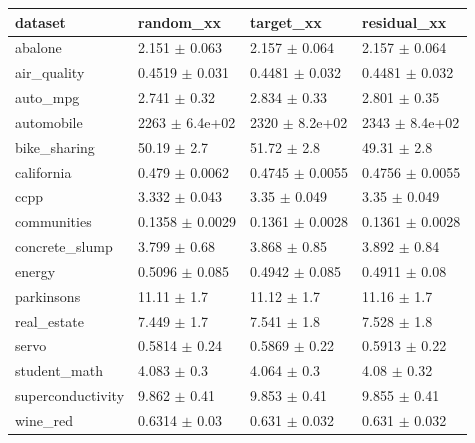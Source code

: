 \begin{tabular}{llll}
\toprule
dataset & random\_xx & target\_xx & residual\_xx \\
\midrule
abalone & 2.151 $\pm$ 0.063 & 2.157 $\pm$ 0.064 & 2.157 $\pm$ 0.064 \\
air\_quality & 0.4519 $\pm$ 0.031 & 0.4481 $\pm$ 0.032 & 0.4481 $\pm$ 0.032 \\
auto\_mpg & 2.741 $\pm$ 0.32 & 2.834 $\pm$ 0.33 & 2.801 $\pm$ 0.35 \\
automobile & 2263 $\pm$ 6.4e+02 & 2320 $\pm$ 8.2e+02 & 2343 $\pm$ 8.4e+02 \\
bike\_sharing & 50.19 $\pm$ 2.7 & 51.72 $\pm$ 2.8 & 49.31 $\pm$ 2.8 \\
california & 0.479 $\pm$ 0.0062 & 0.4745 $\pm$ 0.0055 & 0.4756 $\pm$ 0.0055 \\
ccpp & 3.332 $\pm$ 0.043 & 3.35 $\pm$ 0.049 & 3.35 $\pm$ 0.049 \\
communities & 0.1358 $\pm$ 0.0029 & 0.1361 $\pm$ 0.0028 & 0.1361 $\pm$ 0.0028 \\
concrete\_slump & 3.799 $\pm$ 0.68 & 3.868 $\pm$ 0.85 & 3.892 $\pm$ 0.84 \\
energy & 0.5096 $\pm$ 0.085 & 0.4942 $\pm$ 0.085 & 0.4911 $\pm$ 0.08 \\
parkinsons & 11.11 $\pm$ 1.7 & 11.12 $\pm$ 1.7 & 11.16 $\pm$ 1.7 \\
real\_estate & 7.449 $\pm$ 1.7 & 7.541 $\pm$ 1.8 & 7.528 $\pm$ 1.8 \\
servo & 0.5814 $\pm$ 0.24 & 0.5869 $\pm$ 0.22 & 0.5913 $\pm$ 0.22 \\
student\_math & 4.083 $\pm$ 0.3 & 4.064 $\pm$ 0.3 & 4.08 $\pm$ 0.32 \\
superconductivity & 9.862 $\pm$ 0.41 & 9.853 $\pm$ 0.41 & 9.855 $\pm$ 0.41 \\
wine\_red & 0.6314 $\pm$ 0.03 & 0.631 $\pm$ 0.032 & 0.631 $\pm$ 0.032 \\
\bottomrule
\end{tabular}
